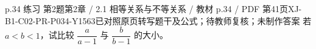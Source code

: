 \par\noindent\begin{minipage}{\linewidth}
\begin{bankitem}{p.34 练习 第2题}{第2章 / 2.1 相等关系与不等关系 / 教材 p.34 / PDF 第41页}{XJ-B1-C02-PR-P034-Y1563}{已对照原页转写题干及公式；待教师复核；未制作答案}
若 $a<b<1$，试比较 $\dfrac a{a-1}$ 与 $\dfrac b{b-1}$ 的大小。
\end{bankitem}
\end{minipage}\par\medskip
